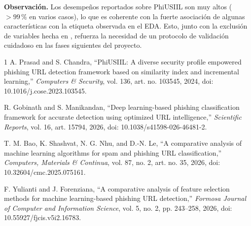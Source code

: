 \documentclass[conference]{IEEEtran}
\begin{document}
\textbf{Observación.} Los desempeños reportados sobre PhiUSIIL son muy altos ($>99\,\%$ en varios
casos), lo que es coherente con la fuerte asociación de algunas características con la etiqueta
observada en el EDA. Esto, junto con la exclusión de variables hecha en \cite{yulianti2026},
refuerza la necesidad de un protocolo de validación cuidadoso en las fases siguientes del
proyecto.

\newpage
\begin{thebibliography}{1}
A. Prasad and S. Chandra, ``PhiUSIIL: A diverse security profile empowered phishing URL
detection framework based on similarity index and incremental learning,''
\emph{Computers \& Security}, vol. 136, art. no. 103545, 2024,
doi: 10.1016/j.cose.2023.103545.

R. Gobinath and S. Manikandan, ``Deep learning-based phishing classification framework for
accurate detection using optimized URL intelligence,'' \emph{Scientific Reports}, vol. 16,
art. 15794, 2026, doi: 10.1038/s41598-026-46481-2.

T. M. Bao, K. Shashvat, N. G. Nhu, and D.-N. Le, ``A comparative analysis of machine learning
algorithms for spam and phishing URL classification,'' \emph{Computers, Materials \& Continua},
vol. 87, no. 2, art. no. 35, 2026, doi: 10.32604/cmc.2025.075161.

F. Yulianti and J. Forenziana, ``A comparative analysis of feature selection methods for
machine learning-based phishing URL detection,'' \emph{Formosa Journal of Computer and
Information Science}, vol. 5, no. 2, pp. 243--258, 2026, doi: 10.55927/fjcis.v5i2.16783.
\end{thebibliography}
\end{document}
